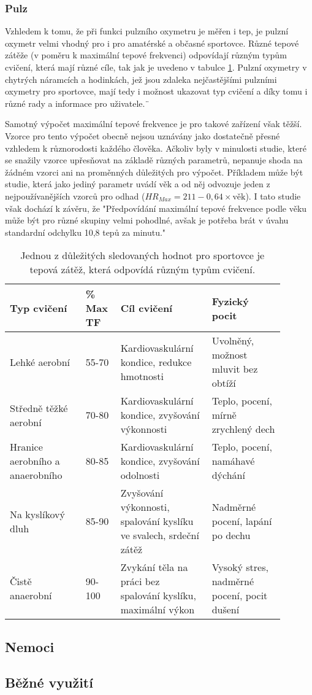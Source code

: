 \subsubsection {Pulz}
Vzhledem k tomu, že při funkci pulzního oxymetru je měřen i tep, je pulzní oxymetr velmi vhodný pro i pro amatérské a občasné sportovce. Různé tepové zátěže (v poměru k maximální tepové frekvenci) odpovídají různým typům cvičení, která mají různé cíle, tak jak je uvedeno v tabulce \ref{tab:MTF}. Pulzní oxymetry v chytrých náramcích a hodinkách, jež jsou zdaleka nejčastějšími pulzními oxymetry pro sportovce, mají tedy i možnost ukazovat typ cvičení a díky tomu i různé rady a informace pro uživatele.¨
\par Samotný výpočet maximální tepové frekvence je pro takové zařízení však těžší. Vzorce pro tento výpočet obecně nejsou uznávány jako dostatečně přesné vzhledem k různorodosti každého člověka. Ačkoliv byly v minulosti studie, které se snažily vzorce upřesňovat na základě různých parametrů, nepanuje shoda na žádném vzorci ani na proměnných důležitých pro výpočet. Příkladem může být studie, která jako jediný parametr uvádí věk a od něj odvozuje jeden z nejpoužívanějších vzorců pro odhad ($HR_{Max}=211-0,64\times\text{věk}$). I tato studie však dochází k závěru, že "Předpovídání maximální tepové frekvence podle věku může být pro různé skupiny velmi pohodlné, avšak je potřeba brát v úvahu standardní odchylku 10,8 tepů za minutu." \citep{maxHR}
\begin{table}[H]
    \centering
    \begin{tabular}{p{0.25\linewidth} | p{0.1\linewidth} | p{0.30\linewidth} | p{0.24\linewidth}}
        \textbf{Typ cvičení}            & \textbf{\% Max TF} & \textbf{Cíl cvičení}                                              & \textbf{Fyzický pocit}              \\ \hline
        Lehké aerobní                   & 55-70                    & Kardiovaskulární kondice, redukce hmotnosti                       & Uvolněný, možnost mluvit bez obtíží \\
        Středně těžké aerobní           & 70-80                    & Kardiovaskulární kondice, zvyšování výkonnosti                    & Teplo, pocení, mírně zrychlený dech \\
        Hranice aerobního a anaerobního & 80-85                    & Kardiovaskulární kondice, zvyšování odolnosti                     & Teplo, pocení, namáhavé dýchání     \\
        Na kyslíkový dluh               & 85-90                    & Zvyšování výkonnosti, spalování kyslíku ve svalech, srdeční zátěž & Nadměrné pocení, lapání po dechu    \\
        Čistě anaerobní                 & 90-100                   & Zvykání těla na práci bez spalování kyslíku, maximální výkon      & Vysoký stres, nadměrné pocení, pocit dušení
    \end{tabular}
    \caption[Typy cvičení podle maximální tepové frekvence]{Jednou z důležitých sledovaných hodnot pro sportovce je tepová zátěž, která odpovídá různým typům cvičení. \citep{tep}}%
    \label{tab:MTF}
\end{table}
\subsection {Nemoci}
\subsection {Běžné využití}